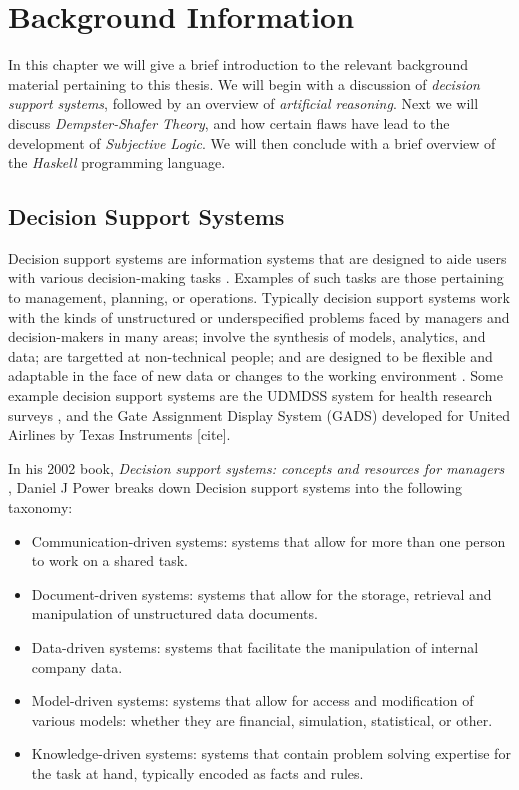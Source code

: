\documentclass[thesis.tex]{subfiles}
\begin{document}
\chapter{Background Information}
\label{chap:background-information}

In this chapter we will give a brief introduction to the relevant background material pertaining
to this thesis. We will begin with a discussion of \emph{decision support systems}, followed by
an overview of \emph{artificial reasoning}. Next we will discuss \emph{Dempster-Shafer Theory}, and
how certain flaws have lead to the development of \emph{Subjective Logic}. We will then conclude with
a brief overview of the \emph{Haskell} programming language.



\section{Decision Support Systems}

Decision support systems are information systems that are designed to aide users with various
decision-making tasks \cite{sprague1980framework}. Examples of such tasks are those pertaining to management,
planning, or operations. Typically decision support systems work with the kinds of unstructured
or underspecified problems faced by managers and decision-makers in many areas; involve the
synthesis of models, analytics, and data; are targetted at non-technical people; and are designed
to be flexible and adaptable in the face of new data or changes to the working environment
\cite{sprague1980framework}. Some example decision support systems are the UDMDSS system
for health research surveys \cite{kent2010application},
and the Gate Assignment Display System (GADS) developed for United Airlines
by Texas Instruments [cite].

In his 2002 book, \emph{Decision support systems: concepts and resources for managers}
\cite{power2002decision}, Daniel J Power breaks down Decision support systems into the following
taxonomy:

\begin{itemize}
  \item Communication-driven systems: systems that allow for more than one person to work on a shared task.
  \item Document-driven systems: systems that allow for the storage, retrieval and manipulation of unstructured data documents.
  \item Data-driven systems: systems that facilitate the manipulation of internal company data.
  \item Model-driven systems: systems that allow for access and modification of various models: whether they are financial, simulation, statistical, or other.
  \item Knowledge-driven systems: systems that contain problem solving expertise for the task at hand, typically encoded as facts and rules.
\end{itemize}
\end{document}
